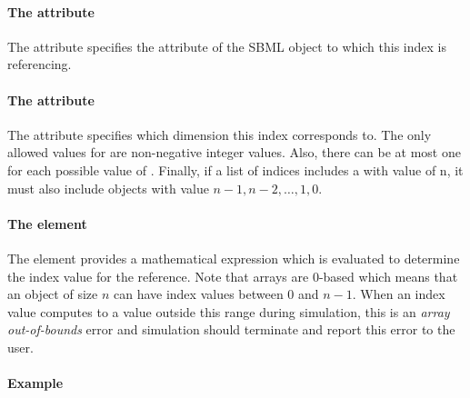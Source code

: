 \paragraph{The  attribute}

The  attribute specifies the attribute of the SBML object to which this index is referencing.    

\paragraph{The  attribute}

The  attribute specifies which dimension this index corresponds to.
{\color{red} The only allowed values for  are
  non-negative integer values. Also, there can be at most one \Index for each possible value of
. Finally, if a list of indices includes a
\Index with  value of n, it must also
include \Index objects with value $n-1, n-2, \dots , 1, 0$.}

\paragraph{The  element}

The  element provides a mathematical expression which is evaluated to determine the index value for the reference.   Note that arrays are 0-based which means that an object of size $n$ can have index values between 0 and $n-1$.   When an index value computes to a value outside this range during simulation, this is an \emph{array out-of-bounds} error and simulation should terminate and report this error to the user.

\paragraph{Example}


